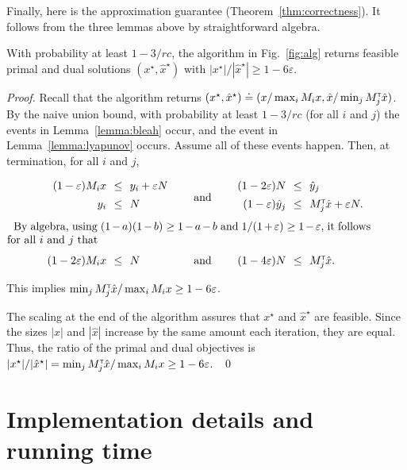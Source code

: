 \documentclass[11pt]{svjour3} \usepackage{fullpage}
\newcommand{\primalOf}[1]{{{#1}}}
\newcommand{\dualOf}[1]{{\hat{#1}}}
\newcommand{\MM}{M}
\newcommand{\xp}{\primalOf x}
\newcommand{\yp}{\primalOf y}
\newcommand{\xd}{\dualOf x}
\newcommand{\yd}{\dualOf y}
\newenvironment{Proof}{\begin{proof}}{{} ~\hfill\hfill\qed~\end{proof}}
\newcommand{\eps}{\varepsilon}
\newcommand{\tran}{^{\scriptscriptstyle \sf T\hspace*{-0.05em}}}
\newcommand{\rows}{r}
\newcommand{\columns}{c}
\begin{document}
Finally, here is the approximation guarantee (Theorem~\ref{thm:correctness}).
It follows from the three lemmas above by straightforward algebra.

\begin{theorem}\label{thm:correctness}
With probability at least $1-3/\rows\columns$, the algorithm in Fig.~\ref{fig:alg} returns feasible primal and dual solutions
$(\xp^\star,\xd^\star)$ with $|\xp^\star|/|\xd^\star| \ge 1-6\eps$.
\end{theorem}
\begin{Proof}
Recall that the algorithm returns
 $(\xp^\star,\xd^\star) \doteq (\xp/\max_i \MM_i\xp, \xd/\min_j \MM_j\tran\xd)$.
By the naive union bound,
with probability at least $1-3/\rows\columns$
(for all $i$ and $j$) the events in Lemma~\ref{lemma:bleah} occur,
and the event in Lemma~\ref{lemma:lyapunov} occurs.
Assume all of these events happen.  Then, at termination, for all $i$ and $j$,

\bigskip
\noindent
$
\begin{array}{@{}l@{}r@{~~}c@{~~}lcr@{~~}c@{~~}l}
&(1-\eps)M_i \xp & \le & \yp_i + \eps N 
& & (1-2\eps) N  & \le & \yd_j
\\
&\yp_i & \le &  N
& \raisebox{6pt}{\mbox{~~~~and~~~~}} & (1-\eps)\yd_j&\le&M\tran_j \xd + \eps N .
\\[9pt]
\lefteqn{\parbox{0.95\textwidth}{~~By algebra, using $(1-a)(1-b)\ge 1-a-b$ and $1/(1+\eps)\ge 1-\eps$, it follows for all $i$ and $j$ that}}
\\[13pt]
& \hspace*{0.5in}(1-2\eps)\MM_i\xp& \le & N
& \mbox{ and } &
(1-4\eps)N & \le & \MM_j\tran \xd. 
\end{array}
$
\bigskip

This implies $\min_j\MM_j\tran\xd / \max_i\MM_i\xp \ge 1-6\eps$.

The scaling at the end of the algorithm assures that $\xp^\star$ and $\xd^\star$ are feasible.
Since the sizes $|\xp|$ and $|\xd|$ increase by the same amount each iteration, they are equal.
Thus, the ratio of the primal and dual objectives 
is $|\xp^\star|/|\xd^\star| = \min_j\MM_j\tran\xd / \max_i\MM_i\xp \ge 1-6\eps$.
\end{Proof}


\section{Implementation details and running time}\label{sec:implementation}\label{sec:time}
\end{document}
